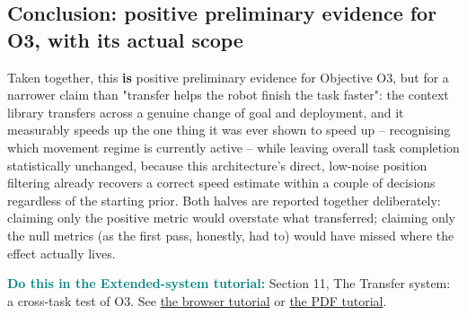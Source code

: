 \documentclass[11pt,a4paper]{article}
\newcommand{\tutoext}[2]{\par\textcolor{teal}{\textbf{Do this in the Extended-system tutorial:}} Section #1, #2. See \href{Tutorial_EXT1_EN.html}{the browser tutorial} or \href{Tutorial_EXT1_EN.pdf}{the PDF tutorial}.\par}
\begin{document}
\subsection{Conclusion: positive preliminary evidence for O3, with its actual scope}
\label{sec:transfer-diagnosis}
Taken together, this \textbf{is} positive preliminary evidence for Objective O3, but
for a narrower claim than "transfer helps the robot finish the task faster": the
context library transfers across a genuine change of goal and deployment, and it
measurably speeds up the one thing it was ever shown to speed up --
recognising which movement regime is currently active -- while leaving overall
task completion statistically unchanged, because this architecture's direct,
low-noise position filtering already recovers a correct speed estimate within a
couple of decisions regardless of the starting prior. Both halves are reported
together deliberately: claiming only the positive metric would overstate what
transferred; claiming only the null metrics (as the first pass, honestly, had to)
would have missed where the effect actually lives.
\tutoext{11}{The Transfer system: a cross-task test of O3}
\end{document}
